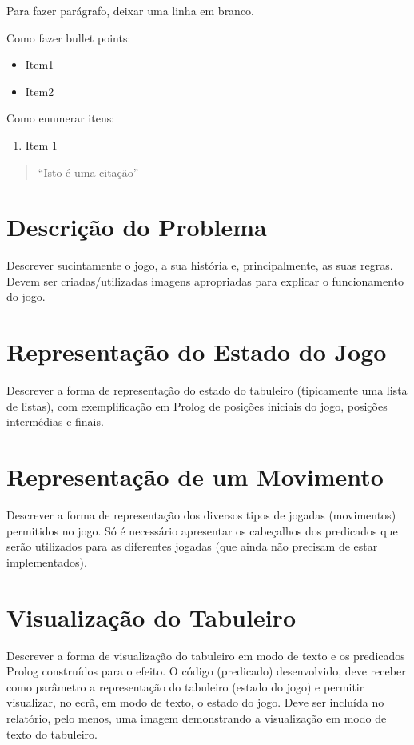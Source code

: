 \documentclass[15pt,a4paper]{article}
\begin{document}
Para fazer parágrafo, deixar uma linha em branco.

Como fazer bullet points:

\begin{itemize}
\item Item1
\item Item2
\end{itemize}

Como enumerar itens:

\begin{enumerate}
\item Item 1
\end{enumerate}

\begin{quote}``Isto é uma citação''\end{quote}

\section{Descrição do Problema}
Descrever sucintamente o jogo, a sua história e, principalmente, as suas regras. Devem ser criadas/utilizadas imagens apropriadas para explicar o funcionamento do jogo.

\section{Representação do Estado do Jogo}
Descrever a forma de representação do estado do tabuleiro (tipicamente uma lista de listas), com exemplificação em Prolog de posições iniciais do jogo, posições intermédias e finais.

\section{Representação de um Movimento}
Descrever a forma de representação dos diversos tipos de jogadas (movimentos) permitidos no jogo. Só é necessário apresentar os cabeçalhos dos predicados que serão utilizados para as diferentes jogadas (que ainda não precisam de estar implementados).

\section{Visualização do Tabuleiro}
Descrever a forma de visualização do tabuleiro em modo de texto e os predicados Prolog construídos para o efeito. O código (predicado) desenvolvido, deve receber como parâmetro a representação do tabuleiro (estado do jogo) e permitir visualizar, no ecrã, em modo de texto, o estado do jogo. Deve ser incluída no relatório, pelo menos, uma imagem demonstrando a visualização em modo de texto do tabuleiro.
\end{document}
